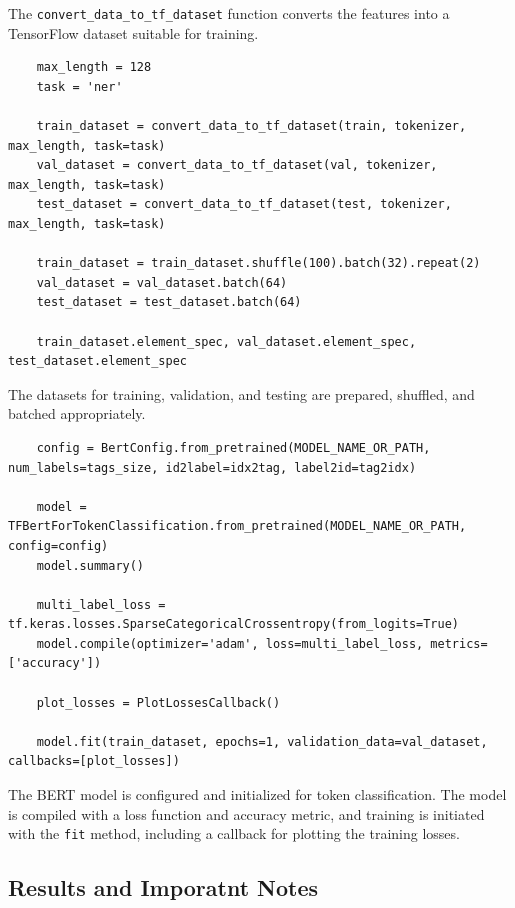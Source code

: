 \documentclass{solutionclass} %
\begin{document}
\begin{solution}
    The \texttt{convert\_data\_to\_tf\_dataset} function converts the features into a TensorFlow dataset suitable for training.
    
    \begin{lstlisting}
    max_length = 128
    task = 'ner'
    
    train_dataset = convert_data_to_tf_dataset(train, tokenizer, max_length, task=task)
    val_dataset = convert_data_to_tf_dataset(val, tokenizer, max_length, task=task)
    test_dataset = convert_data_to_tf_dataset(test, tokenizer, max_length, task=task)
    
    train_dataset = train_dataset.shuffle(100).batch(32).repeat(2)
    val_dataset = val_dataset.batch(64)
    test_dataset = test_dataset.batch(64)
    
    train_dataset.element_spec, val_dataset.element_spec, test_dataset.element_spec
    \end{lstlisting}
    
    The datasets for training, validation, and testing are prepared, shuffled, and batched appropriately.
    
    \begin{lstlisting}
    config = BertConfig.from_pretrained(MODEL_NAME_OR_PATH, num_labels=tags_size, id2label=idx2tag, label2id=tag2idx)
    
    model = TFBertForTokenClassification.from_pretrained(MODEL_NAME_OR_PATH, config=config)
    model.summary()
    
    multi_label_loss = tf.keras.losses.SparseCategoricalCrossentropy(from_logits=True)
    model.compile(optimizer='adam', loss=multi_label_loss, metrics=['accuracy'])
    
    plot_losses = PlotLossesCallback()
    
    model.fit(train_dataset, epochs=1, validation_data=val_dataset, callbacks=[plot_losses])
    \end{lstlisting}
    
    The BERT model is configured and initialized for token classification. The model is compiled with a loss function and accuracy metric, and training is initiated with the \texttt{fit} method, including a callback for plotting the training losses.
    
\end{solution}

\newpage
\subsection*{Results and Imporatnt Notes}
\end{document}
